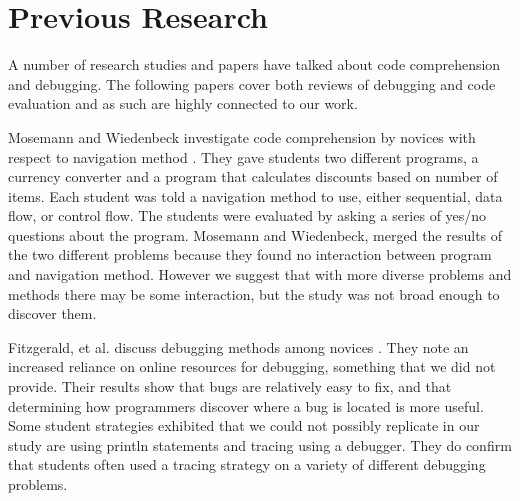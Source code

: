 \section{Previous Research}

A number of research studies and papers have talked about code comprehension and debugging.
The following papers cover both reviews of debugging and code evaluation and as such are highly connected to our work. 

Mosemann and Wiedenbeck investigate code comprehension by novices with respect to navigation method \cite{mosemann2001}.
They gave students two different programs, a currency converter and a program that calculates discounts based on number of items.
Each student was told a navigation method to use, either sequential, data flow, or control flow.
The students were evaluated by asking a series of yes/no questions about the program.
Mosemann and Wiedenbeck, merged the results of the two different problems because they found no interaction between program and navigation method.
However we suggest that with more diverse problems and methods there may be some interaction, but the study was not broad enough to discover them.

	
Fitzgerald, et al. discuss debugging methods among novices \cite{fitzgerald2008}.
They note an increased reliance on online resources for debugging, something that we did not provide.
Their results show that bugs are relatively easy to fix, and that determining how programmers discover where a bug is located is more useful.
Some student strategies exhibited that we could not possibly replicate in our study are using println statements and tracing using a debugger.
They do confirm that students often used a tracing strategy on a variety of different debugging problems.

